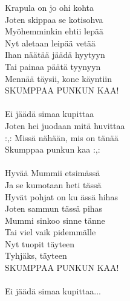 
            Krapula on jo ohi kohta \\
            Joten skippaa se kotisohva \\
            Myöhemminkin ehtii lepää \\
            Nyt aletaan leipää vetää \\
            Ihan näätää jäädä hyytyyn \\
            Tai painaa päätä tyynyyn \\
            Mennää täysii, kone käyntiin \\
            SKUMPPAA PUNKUN KAA! \\
\hspace{10mm} \\
            Ei jäädä simaa kupittaa \\
            Joten hei juodaan mitä huvittaa \\
            :,: Missä nähään, mis on tänää \\
            Skumppaa punkun kaa :,: \\
\hspace{10mm} \\
            Hyvää Mummii etsimässä \\
            Ja se kumotaan heti tässä \\
            Hyvät pohjat on ku ässä hihas \\
            Joten sammun tässä pihas \\
            Mummi sinkoo sinne tänne \\
            Tai viel vaik pidemmälle \\
            Nyt tuopit täyteen \\
            Tyhjäks, täyteen \\
            SKUMPPAA PUNKUN KAA! \\
\hspace{10mm} \\
            Ei jäädä simaa kupittaa... \\
